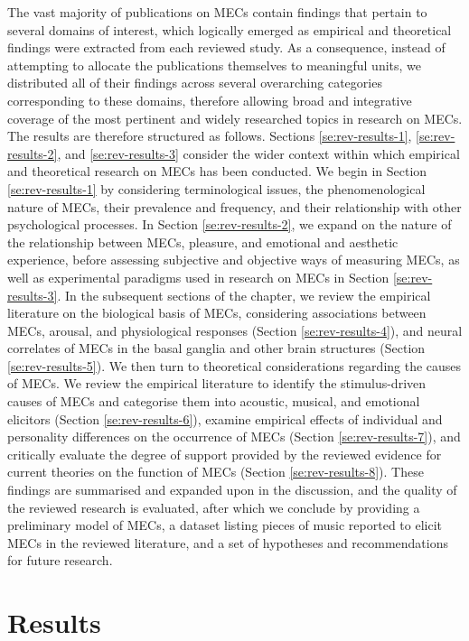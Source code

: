 The vast majority of publications on MECs contain findings that pertain to several domains of interest, which logically emerged as empirical and theoretical findings were extracted from each reviewed study. As a consequence, instead of attempting to allocate the publications themselves to meaningful units, we distributed all of their findings across several overarching categories corresponding to these domains, therefore allowing broad and integrative coverage of the most pertinent and widely researched topics in research on MECs. The results are therefore structured as follows. Sections \ref{se:rev-results-1}, \ref{se:rev-results-2}, and \ref{se:rev-results-3} consider the wider context within which empirical and theoretical research on MECs has been conducted. We begin in Section \ref{se:rev-results-1} by considering terminological issues, the phenomenological nature of MECs, their prevalence and frequency, and their relationship with other psychological processes. In Section \ref{se:rev-results-2}, we expand on the nature of the relationship between MECs, pleasure, and emotional and aesthetic experience, before assessing subjective and objective ways of measuring MECs, as well as experimental paradigms used in research on MECs in Section \ref{se:rev-results-3}. In the subsequent sections of the chapter, we review the empirical literature on the biological basis of MECs, considering associations between MECs, arousal, and physiological responses (Section \ref{se:rev-results-4}), and neural correlates of MECs in the basal ganglia and other brain structures (Section \ref{se:rev-results-5}). We then turn to theoretical considerations regarding the causes of MECs. We review the empirical literature to identify the stimulus-driven causes of MECs and categorise them into acoustic, musical, and emotional elicitors (Section \ref{se:rev-results-6}), examine empirical effects of individual and personality differences on the occurrence of MECs (Section \ref{se:rev-results-7}), and critically evaluate the degree of support provided by the reviewed evidence for current theories on the function of MECs (Section \ref{se:rev-results-8}). These findings are summarised and expanded upon in the discussion, and the quality of the reviewed research is evaluated, after which we conclude by providing a preliminary model of MECs, a dataset listing pieces of music reported to elicit MECs in the reviewed literature, and a set of hypotheses and recommendations for future research.

\section{Results}
\label{se:rev-results}


